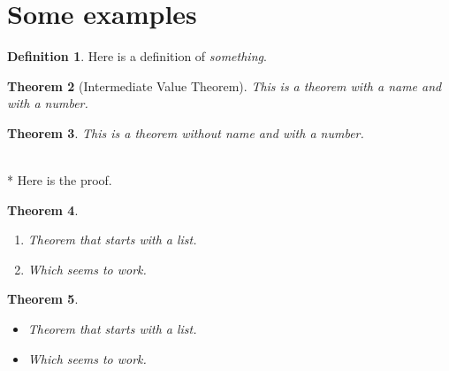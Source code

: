 \documentclass[12pt]{article}
\makeatletter
\theoremstyle{theorem}
\newtheorem{thm}{Theorem}[section]
\theoremstyle{definition}
\newtheorem{defn}[thm]{Definition}
\theoremstyle{remark}
\renewenvironment{proof}[1][\proofname] {\par\pushQED{\qed}\normalfont\topsep6\p@\@plus6\p@\relax\trivlist\item[\hskip\labelsep\bfseries#1\@addpunct{.}]\mbox{}\\*}{\popQED\endtrivlist\@endpefalse}
\makeatother
\begin{document}
\section{Some examples}

\begin{defn}
Here is a definition of \emph{something}.
\end{defn}

\begin{thm}[Intermediate Value Theorem]
This is a theorem with a name and with a number.
\end{thm}

\begin{thm}
This is a theorem without name and with a number.
\end{thm}

\begin{proof}
Here is the proof.
\end{proof}

\begin{thm}
\begin{enumerate}
\item Theorem that starts with a list.
\item Which seems to work.
\end{enumerate}
\end{thm}

\begin{thm}
\begin{itemize}
\item Theorem that starts with a list.
\item Which seems to work.
\end{itemize}
\end{thm}
\end{document}
